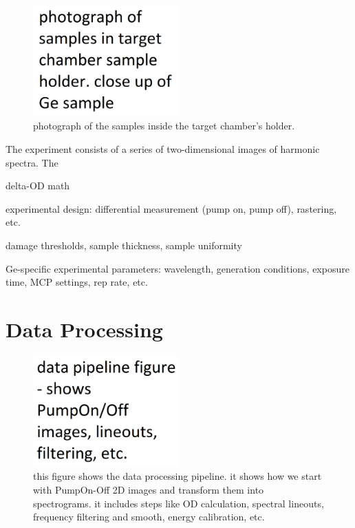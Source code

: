 \begin{figure}
	\centering
	\includegraphics[width=0.5\textwidth]{figures/chap3/Samples_in_holder.png}
	\caption{photograph of the samples inside the target chamber's holder.}
	\label{fig:Samples_in_holder}
\end{figure}

The experiment consists of a series of two-dimensional images of harmonic spectra. The 


delta-OD math


experimental design: differential measurement (pump on, pump off), rastering, etc.

damage thresholds, sample thickness, sample uniformity

Ge-specific experimental parameters: wavelength, generation conditions, exposure time, MCP settings, rep rate, etc.




\section{Data Processing}

\begin{figure}
	\centering
	\includegraphics[width=0.5\textwidth]{figures/chap3/Data_Pipeline.png}
	\caption{this figure shows the data processing pipeline. it shows how we start with PumpOn-Off 2D images and transform them into spectrograms. it includes steps like OD calculation, spectral lineouts, frequency filtering and smooth, energy calibration, etc.}
	\label{fig:Data_Pipeline}
\end{figure}

